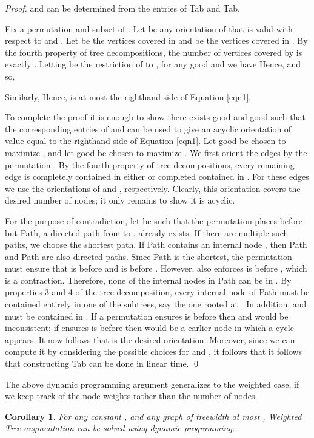 \documentclass{article}
\newtheorem{cor}[theorem]{Corollary}
\begin{document}
\begin{proof}
and  can be determined from the entries of {\sc Tab} and {\sc Tab}.


Fix a permutation  and subset  of .
Let  be any orientation of  that is valid with respect to  and .
Let  be the vertices covered in  and  be the vertices covered in .
By the fourth property of tree decompositions, the number of vertices covered by  is exactly .
Letting  be the restriction of  to , for any good  and  we have 
Hence,  and so, 

Similarly, 
Hence, 
 is at most the righthand side of Equation \ref{eqn1}.

To complete the proof it is enough to show there exists good  and good  such that the corresponding entries of  and  can be used to give an acyclic orientation of value equal to the righthand side of Equation \ref{eqn1}.
Let good  be chosen to maximize , and let good  be chosen to maximize .
We first orient the edges  by the permutation .  
By the fourth property of tree decompositions, every remaining edge is completely contained in either  or completed contained in .
For these edges we use the orientations of  and , respectively.  
Clearly, this orientation covers the desired number of nodes; it only remains to show it is acyclic.  

For the purpose of contradiction, let  be such that the permutation  places  before  but {\sc Path}, a directed path from  to , already exists. 
If there are multiple such paths, we choose the shortest path.
If {\sc Path} contains an internal node , then
{\sc Path} and {\sc Path} are also directed paths. Since
{\sc Path} is the shortest, the permutation  must ensure that  is before  and  is before . However,  also enforces  is before
, which is a contraction.
Therefore, none of the internal nodes in {\sc Path} can be in
. By properties 3 and 4 of the tree decomposition, every
internal node of {\sc Path} must be contained entirely in one
of the subtrees, say the one rooted at . In addition,  and
 must be contained in .  If a permutation
 ensures  is before  then  and  would be
inconsistent; if  ensures  is before  then  would be a
earlier node in which a cycle appears.
It now follows that  is the desired orientation.
Moreover, since we can compute it by considering the  possible choices for  and , it follows that it follows that constructing {\sc Tab} can be done in linear time.
\qed 
\end{proof}
The above dynamic programming argument generalizes to the 
weighted case, if we keep track of the node weights rather than 
the number of nodes.
\begin{cor}
For any constant , and any graph  of treewidth at most ,
{\sc Weighted Tree augmentation} 
can be solved using dynamic programming.
\end{cor}
\end{document}
